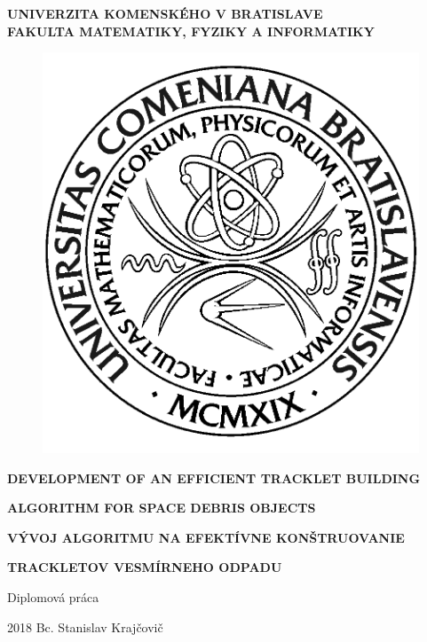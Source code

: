 \documentclass[12pt, a4paper, oneside]{book}
\newcommand{\mfthesistype}{Diplomová práca}
\newcommand{\mfauthor}{Bc. Stanislav Krajčovič}
\newcommand{\mfuniversity}{UNIVERZITA KOMENSKÉHO V BRATISLAVE}
\newcommand{\mffaculty}{FAKULTA MATEMATIKY, FYZIKY A INFORMATIKY}
\begin{document}
\frontmatter

\thispagestyle{empty}

\noindent
\begin{minipage}{\textwidth}
\begin{center}
\textbf{\mfuniversity \\
\mffaculty}
\end{center}
\end{minipage}

\vfill
\begin{figure}[!hbt]
	\begin{center}
		\includegraphics{images/logo_fmph}
		\label{img:logo}
	\end{center}
\end{figure}
\begin{center}
	\begin{minipage}{0.8\textwidth}
		\centerline{\textbf{\Large\MakeUppercase{Development of an efficient tracklet building }}}
		\smallskip
		\centerline{\textbf{\Large\MakeUppercase{algorithm for space debris objects}}}
		\bigskip
		\centerline{\textbf{\Large\MakeUppercase{Vývoj algoritmu na efektívne konštruovanie }}}
		\smallskip
		\centerline{\textbf{\Large\MakeUppercase{trackletov vesmírneho odpadu}}}
		\bigskip
		\bigskip
		\centerline{\mfthesistype}
	\end{minipage}
\end{center}
\vfill
2018 \hfill
\mfauthor
\eject 
\end{document}
